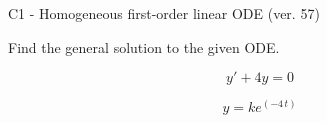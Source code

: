 \begin{exercise}
  \begin{exerciseTitle}C1 - Homogeneous first-order linear ODE (ver. 57)\end{exerciseTitle}
  \begin{exerciseStatement}
    
Find the general solution to the given ODE.

    
\[y'+4y=0\]

  \end{exerciseStatement}
  \begin{exerciseAnswer}
    
\[y= k e^{\left(-4 \, t\right)}\]

  \end{exerciseAnswer}
\end{exercise}
